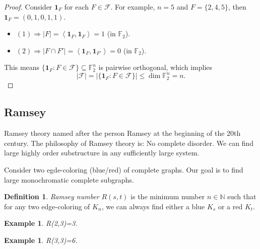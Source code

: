 \documentclass{article}
\newtheorem{example}[theorem]{Example}
\theoremstyle{definition}
\newtheorem{definition}[theorem]{Definition}
\begin{document}
\begin{proof}
    Consider $\mathbf{1}_{F}$ for each $F\in\mathcal{F}$. For example, $n=5$ and $F=\{ 2,4,5\}$, then $\mathbf{1}_{F}=(0,1,0,1,1)$.
    \begin{itemize}
        \item[] $(1)\Rightarrow |F|=\left\langle\mathbf{1}_{F},\mathbf{1}_{F}\right\rangle=1$ (in $\mathbb{F}_{2}$).
        \item[] $(2)\Rightarrow |F\cap F'|=\left\langle\mathbf{1}_{F},\mathbf{1}_{F'}\right\rangle=0$ (in $\mathbb{F}_{2}$).
    \end{itemize}
    This means $\{ \mathbf{1}_{F}: F\in\mathcal{F} \}\subseteq\mathbb{F}_{2}^{n}$ is pairwise orthogonal, which implies $$|\mathcal{F}|=|\{ \mathbf{1}_{F}: F\in\mathcal{F} \}|\leq\dim\mathbb{F}_{2}^{n}=n.$$
\end{proof}

\subsection{Ramsey}

Ramsey theory named after the person Ramsey at the beginning of the 20th century. The philosophy of Ramsey theory is: No complete disorder. We can find large highly order substructure in any sufficiently large system.

Consider two egde-coloring (blue/red) of complete graphs. Our goal is to find large monochromatic complete subgraphs.

\begin{definition}
    \emph{Ramsey number} $R(s,t)$ is the minimum number $n\in\mathbb{N}$ such that for any two edge-coloring of $K_{n}$, we can always find either a blue $K_{s}$ or a red $K_{t}$.
\end{definition}

\begin{example}
    R(2,3)=3.
\end{example}

\begin{example}
    R(3,3)=6.
\end{example}
\end{document}
